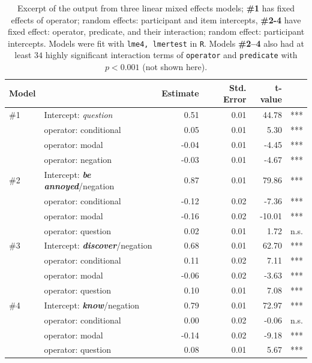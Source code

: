 \documentclass[11pt, a4paper]{article}
\begin{document}
\begin{table}[h]
	\centering
	\begin{tabular}{llrrrr}
		Model & & Estimate & Std. Error & t-value\\
		\midrule
		\#1 & Intercept: \emph{question} & 0.51 & 0.01 & 44.78 & ***\\
		& operator: conditional & 0.05 & 0.01 & 5.30 & ***\\
		& operator: modal & -0.04 & 0.01 & -4.45 & ***\\
		& operator: negation & -0.03 & 0.01 & -4.67 & ***\\
		\midrule
		\#2 & Intercept: \emph{\bf be annoyed}/negation & 0.87 & 0.01 & 79.86 & ***\\
		& operator: conditional & -0.12 & 0.02  & -7.36 & ***\\
		& operator: modal & -0.16 & 0.02  & -10.01 & ***\\
		& operator: question & 0.02 & 0.01 & 1.72 & n.s.\\
		\midrule
		\#3 & Intercept: \emph{\bf discover}/negation & 0.68 & 0.01 & 62.70 & ***\\
		& operator: conditional & 0.11 & 0.02 & 7.11 & ***\\
		& operator: modal & -0.06 & 0.02 & -3.63 & ***\\
		& operator: question & 0.10 & 0.01 & 7.08 & ***\\
		\midrule
		\#4 & Intercept: \emph{\bf know}/negation & 0.79 & 0.01 & 72.97 & ***\\
		& operator: conditional & 0.00 & 0.02 & -0.06 & n.s.\\
		& operator: modal & -0.14 & 0.02 & -9.18 & ***\\
		& operator: question & 0.08 & 0.01 & 5.67 & ***\\
		\bottomrule
	\end{tabular}
	\caption{\small Excerpt of the output from three linear mixed effects models; \textbf{\#1} has fixed effects of operator; random effects: participant and item intercepts, \textbf{\#2-4} have fixed effect: operator, predicate, and their interaction; random effect: participant intercepts.
		Models were fit with \texttt{lme4, lmertest} in \texttt{R}. Models \textbf{\#2--4} also had at least $34$ highly significant interaction terms of \texttt{operator} and \texttt{predicate} with $p < 0.001$ (not shown here).}\label{t:models}
\end{table}
\end{document}
